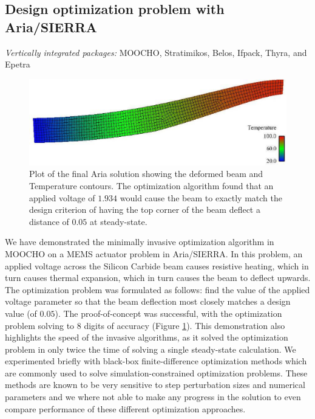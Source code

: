 \documentclass[pdf,ps2pdf,11pt]{SANDreport}
\begin{document}
%
\subsection{Design optimization problem with Aria/SIERRA}
%

{}\noindent\textit{Vertically integrated packages:} MOOCHO, Stratimikos,
Belos, Ifpack, Thyra, and Epetra

{\bsinglespace
\begin{figure}
\begin{center}
\includegraphics*[angle=0,scale=0.50
]{SiC_dY0.1.eps}
\end{center}
\caption[Final optimization solution for Aria MEMS actuator design problem]{
\label{fig:ariaFinal}
Plot of the final Aria solution showing the deformed beam and Temperature
contours. The optimization algorithm found that an applied voltage of $1.934$
would cause the beam to exactly match the design criterion of having the top
corner of the beam deflect a distance of $0.05$ at steady-state.  }
\end{figure}
\esinglespace}

We have demonstrated the minimally invasive optimization algorithm in MOOCHO
on a MEMS actuator problem in Aria/SIERRA.  In this problem, an applied
voltage across the Silicon Carbide beam causes resistive heating, which in
turn causes thermal expansion, which in turn causes the beam to deflect
upwards. The optimization problem was formulated as follows: find the value of
the applied voltage parameter so that the beam deflection most closely matches
a design value (of $0.05$). The proof-of-concept was successful, with the
optimization problem solving to $8$ digits of accuracy (Figure
{}\ref{fig:ariaFinal}). This demonstration also highlights the speed of the
invasive algorithms, as it solved the optimization problem in only twice the
time of solving a single steady-state calculation.  We experimented briefly
with black-box finite-difference optimization methods which are commonly
used to solve simulation-constrained optimization problems.  These methods
are known to be very sensitive to step perturbation sizes and numerical
parameters and we where not able to make any progress in the solution
to even compare performance of these different optimization approaches.
\end{document}
